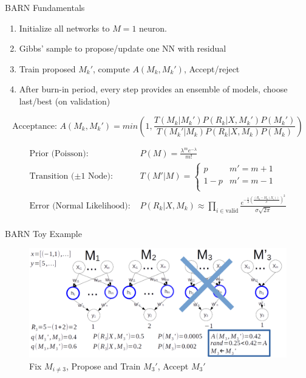 \documentclass{beamer}
\begin{document}
\begin{frame}
\begin{columns}
\begin{column}{.33\textwidth}
\begin{minipage}{.98\textwidth}
{\begin{myblock}{BARN Fundamentals}
\begin{enumerate}
\item Initialize all networks to $M=1$ neuron.
\item Gibbs' sample to propose/update one NN with residual
\item Train proposed $M_k'$, compute $A(M_k,M_k')$, Accept/reject
\item After burn-in period, every step provides an ensemble of models, choose last/best (on validation)
\end{enumerate}

$$
\text{Acceptance: } A(M_k,M_k') = min(1, \frac{T(M_k|M_k') P(R_k|X,M_k')P(M_k')}{T(M_k'|M_k) P(R_k|X,M_k)P(M_k)})
$$

$$
\begin{aligned}
\text{Prior (Poisson): } & P(M) = \frac{\lambda^m e^{-\lambda}}{m!} \\
\text{Transition ($\pm1$ Node): } & T(M'|M) = \begin{cases}
			p & m' = m + 1 \\
			1-p & m' = m - 1 \\
\end{cases} \\
\text{Error (Normal Likelihood): } & P(R_k|X,M_k) \approx \prod_{i \in \text{valid}} \frac{e^{-\frac{1}{2}\left(\frac{(R_k-M_k(X_i))}{\sigma}\right)^2}}{\sigma \sqrt{2\pi}} \\
\end{aligned}
$$
			\end{myblock}
			\begin{myblock}{BARN Toy Example}
\begin{figure}[h]
\includegraphics[scale=0.75]{barn_ex3.png}
\caption{Fix $M_{i\neq 3}$, Propose and Train $M_3'$, Accept $M_3'$}
\end{figure}
			\end{myblock}
	}
	\end{minipage}

\end{column}
\end{columns}
\end{frame}
\end{document}
